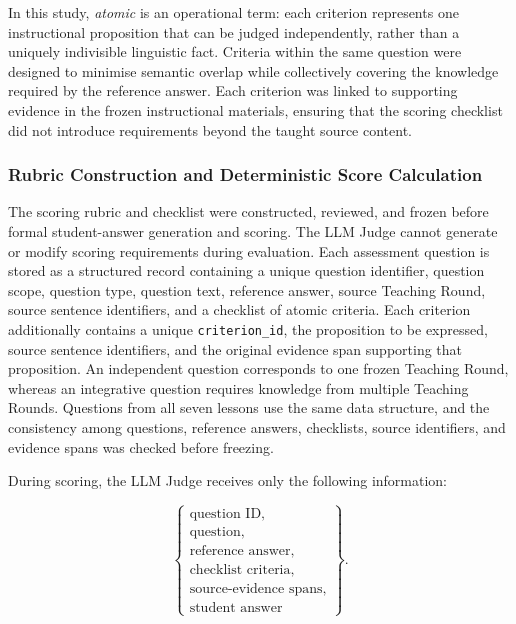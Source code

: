 In this study, \textit{atomic} is an operational term: each criterion represents one instructional proposition that can be judged independently, rather than a uniquely indivisible linguistic fact. Criteria within the same question were designed to minimise semantic overlap while collectively covering the knowledge required by the reference answer. Each criterion was linked to supporting evidence in the frozen instructional materials, ensuring that the scoring checklist did not introduce requirements beyond the taught source content.

\begingroup
{}
\subsubsection{Rubric Construction and Deterministic Score Calculation}
\label{subsec:rubric-construction}

The scoring rubric and checklist were constructed, reviewed, and frozen before formal student-answer generation and scoring. The LLM Judge cannot generate or modify scoring requirements during evaluation. Each assessment question is stored as a structured record containing a unique question identifier, question scope, question type, question text, reference answer, source Teaching Round, source sentence identifiers, and a checklist of atomic criteria. Each criterion additionally contains a unique \texttt{criterion\_id}, the proposition to be expressed, source sentence identifiers, and the original evidence span supporting that proposition. An independent question corresponds to one frozen Teaching Round, whereas an integrative question requires knowledge from multiple Teaching Rounds. Questions from all seven lessons use the same data structure, and the consistency among questions, reference answers, checklists, source identifiers, and evidence spans was checked before freezing.

During scoring, the LLM Judge receives only the following information:

\[
\left\{
\begin{array}{l}
\text{question ID},\\
\text{question},\\
\text{reference answer},\\
\text{checklist criteria},\\
\text{source-evidence spans},\\
\text{student answer}
\end{array}
\right\}.
\]
\endgroup
\newpage

